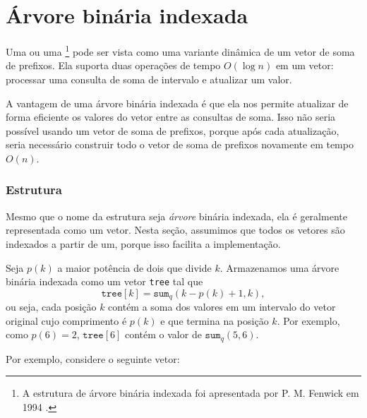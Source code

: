 \section{Árvore binária indexada}


Uma  ou uma \footnote{A
estrutura de árvore binária indexada foi apresentada por P. M. Fenwick em 1994 \cite{fen94}.}
pode ser vista como uma variante dinâmica de um vetor de soma de prefixos.
Ela suporta duas operações de tempo $O(\log n)$ em um vetor:
processar uma consulta de soma de intervalo e atualizar um valor.

A vantagem de uma árvore binária indexada é
que ela nos permite atualizar de forma eficiente
os valores do vetor entre as consultas de soma.
Isso não seria possível usando um vetor de soma de prefixos,
porque após cada atualização, seria necessário construir todo o
vetor de soma de prefixos novamente em tempo $O(n)$.

\subsubsection{Estrutura}

Mesmo que o nome da estrutura seja \emph{árvore} binária indexada,
ela é geralmente representada como um vetor.
Nesta seção, assumimos que todos os vetores são indexados a partir de um,
porque isso facilita a implementação.

Seja $p(k)$ a maior potência de dois que
divide $k$.
Armazenamos uma árvore binária indexada como um vetor \texttt{tree}
tal que
\[ \texttt{tree}[k] = \texttt{sum}_q(k-p(k)+1,k),\]
ou seja, cada posição $k$ contém a soma dos valores
em um intervalo do vetor original cujo comprimento é $p(k)$
e que termina na posição $k$.
Por exemplo, como $p(6)=2$, $\texttt{tree}[6]$
contém o valor de $\texttt{sum}_q(5,6)$.

Por exemplo, considere o seguinte vetor:
\begin{center}
\end{center}

